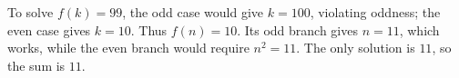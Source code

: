 To solve $f(k)=99$, the odd case would give $k=100$, violating oddness; the even case gives $k=10$. Thus $f(n)=10$. Its odd branch gives $n=11$, which works, while the even branch would require $n^2=11$. The only solution is $11$, so the sum is $\boxed{11}$.
